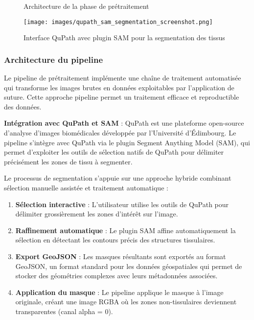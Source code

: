 \documentclass[12pt,a4paper]{report}
\begin{document}
\begin{}
\begin{}
\begin{}
\begin{}
\begin{figure}[H]
\begin{tikzpicture}[node distance=1.5cm, every node/.style={scale=0.7}]
\end{tikzpicture}
\caption{Architecture de la phase de prétraitement}
\end{figure}

\begin{figure}[H]
\centering
\texttt{[image: images/qupath\_sam\_segmentation\_screenshot.png]}
\caption{Interface QuPath avec plugin SAM pour la segmentation des tissus}
\label{fig:qupath_sam}
\end{figure}

\subsubsection{Architecture du pipeline}

Le pipeline de prétraitement implémente une chaîne de traitement automatisée qui transforme les images brutes en données exploitables par l'application de suture. Cette approche pipeline permet un traitement efficace et reproductible des données.

\textbf{Intégration avec QuPath et SAM} : QuPath est une plateforme open-source d'analyse d'images biomédicales développée par l'Université d'Édimbourg. Le pipeline s'intègre avec QuPath via le plugin Segment Anything Model (SAM), qui permet d'exploiter les outils de sélection natifs de QuPath pour délimiter précisément les zones de tissu à segmenter.

Le processus de segmentation s'appuie sur une approche hybride combinant sélection manuelle assistée et traitement automatique :

\begin{enumerate}
\item \textbf{Sélection interactive} : L'utilisateur utilise les outils de QuPath pour délimiter grossièrement les zones d'intérêt sur l'image.
\item \textbf{Raffinement automatique} : Le plugin SAM affine automatiquement la sélection en détectant les contours précis des structures tissulaires.
\item \textbf{Export GeoJSON} : Les masques résultants sont exportés au format GeoJSON, un format standard pour les données géospatiales qui permet de stocker des géométries complexes avec leurs métadonnées associées.
\item \textbf{Application du masque} : Le pipeline applique le masque à l'image originale, créant une image RGBA où les zones non-tissulaires deviennent transparentes (canal alpha = 0).
\end{enumerate}


\end{}
\end{}
\end{}
\end{}
\end{document}
